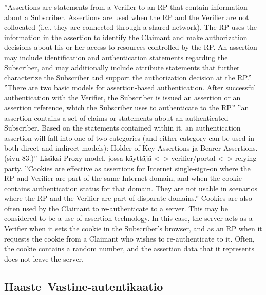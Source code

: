 \documentclass[finnish,gradu]{tktltiki}
\begin{document}
  ''Assertions are statements from a Verifier to an RP that contain information about a
  Subscriber. Assertions are used when the RP and the Verifier are not collocated (i.e., they
  are connected through a shared network). The RP uses the information in the assertion to
  identify the Claimant and make authorization decisions about his or her access to
  resources controlled by the RP. An assertion may include identification and
  authentication statements regarding the Subscriber, and may additionally include attribute
  statements that further characterize the Subscriber and support the authorization decision
  at the RP.''
  ''There are two basic models for assertion-based authentication. After successful
  authentication with the Verifier, the Subscriber is issued an assertion or an assertion
  reference, which the Subscriber uses to authenticate to the RP.''
  ''an assertion contains a set of claims or statements about an
  authenticated Subscriber. Based on the statements contained within it, an authentication
  assertion will fall into one of two categories (and either category can be used in both
  direct and indirect models): Holder-of-Key Assertions ja Bearer Assertions. (sivu 83.)''
  Lisäksi Proxy-model, jossa käyttäjä <--> verifier/portal <--> relying party.
  ''Cookies are effective as assertions for Internet single-sign-on where the RP and Verifier
  are part of the same Internet domain, and when the cookie contains authentication status
  for that domain. They are not usable in scenarios where the RP and the Verifier are part
  of disparate domains.''
  Cookies are also often used by the Claimant to re-authenticate to a server. This may be
  considered to be a use of assertion technology. In this case, the server acts as a Verifier
  when it sets the cookie in the Subscriber’s browser, and as an RP when it requests the
  cookie from a Claimant who wishes to re-authenticate to it. Often, the cookie contains a
  random number, and the assertion data that it represents does not leave the server.


  \subsection{Haaste--Vastine-autentikaatio} %
  \label{sub:haaste_vastine_autentikaatio}
\end{document}
